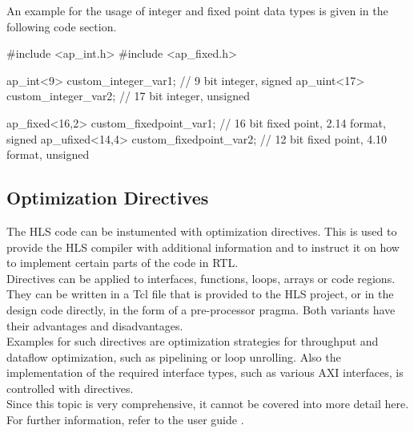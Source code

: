 An example for the usage of integer and fixed point data types is given in the following code section.\\

\begin{CppCode}
  #include <ap_int.h>
  #include <ap_fixed.h>

  ap_int<9>   custom_integer_var1;         //  9 bit integer, signed
  ap_uint<17> custom_integer_var2;         // 17 bit integer, unsigned

  ap_fixed<16,2>  custom_fixedpoint_var1;  // 16 bit fixed point, 2.14 format, signed
  ap_ufixed<14,4> custom_fixedpoint_var2;  // 12 bit fixed point, 4.10 format, unsigned
\end{CppCode}

\subsection{Optimization Directives}

The HLS code can be instumented with optimization directives.
This is used to provide the HLS compiler with additional information and to instruct it on how to implement certain parts of the code in RTL.\\

Directives can be applied to interfaces, functions, loops, arrays or code regions.
They can be written in a Tcl file that is provided to the HLS project, or in the design code directly, in the form of a pre-processor pragma.
Both variants have their advantages and disadvantages.\\

Examples for such directives are optimization strategies for throughput and dataflow optimization, such as pipelining or loop unrolling.
Also the implementation of the required interface types, such as various AXI interfaces, is controlled with directives.\\

Since this topic is very comprehensive, it cannot be covered into more detail here.
For further information, refer to the user guide \cite{VivadoUgHLS}.



